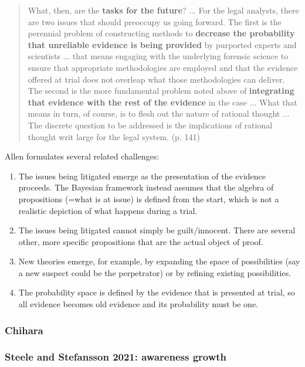 \documentclass[
  11pt,
  dvipsnames,enabledeprecatedfontcommands]{scrartcl}
\begin{document}
\begin{quote}
What, then, are the \textbf{tasks for the future}? ... For the legal
analysts, there are two issues that should preoccupy us going forward. The first is the perennial problem
of constructing methods to \textbf{decrease the probability that unreliable evidence is being provided} by
purported experts and scientists ... that means engaging with the underlying forensic science to ensure that appropriate methodologies are employed and that the evidence offered at trial does not overleap what those methodologies can deliver. The second is the more fundamental problem noted above of \textbf{integrating that evidence with the rest of the evidence} in the case ... What that means in turn, of course, is to flesh out the nature of rational thought ... The discrete question to be addressed is the implications of rational thought writ large for the legal system. (p. 141) 
\end{quote}

Allen formulates several related challenges:

\begin{enumerate}
\def\labelenumi{\arabic{enumi}.}
\item
  The issues being litigated emerge as the presentation of the evidence
  proceeds. The Bayesian framework instead assumes that the algebra of
  propositions (=what is at issue) is defined from the start, which is
  not a realistic depiction of what happens during a trial.
\item
  The issues being litigated cannot simply be guilt/innocent. There are
  several other, more specific propositions that are the actual object
  of proof.
\item
  New theories emerge, for example, by expanding the space of
  possibilities (say a new suspect could be the perpetrator) or by
  refining existing possibilities.
\item
  The probability space is defined by the evidence that is presented at
  trial, so all evidence becomes old evidence and its probability must
  be one.
\end{enumerate}

\hypertarget{chihara}{%
\subsubsection{Chihara}\label{chihara}}

\hypertarget{steele-and-stefansson-2021-awareness-growth}{%
\subsubsection{Steele and Stefansson 2021: awareness
growth}\label{steele-and-stefansson-2021-awareness-growth}}
\end{document}
